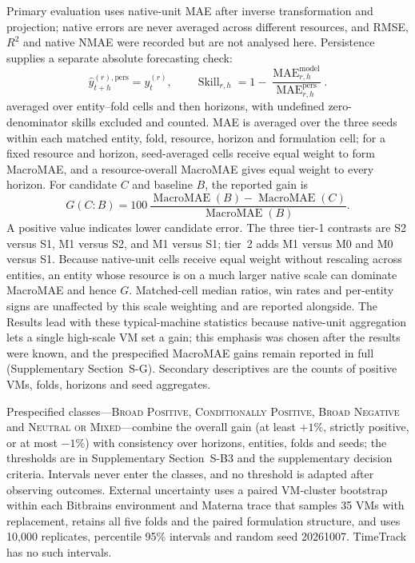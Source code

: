 \documentclass[5p,twocolumn]{elsarticle}
\begin{document}
Primary evaluation uses native-unit MAE after inverse transformation and
projection; native errors are never averaged across different resources, and
RMSE, $R^2$ and native NMAE were recorded but are not analysed here. Persistence supplies a
separate absolute forecasting check:
\begin{equation}
  \widehat{y}_{t+h}^{(r),\mathrm{pers}}=y_t^{(r)},
  \qquad
  \operatorname{Skill}_{r,h}
  =1-\frac{\operatorname{MAE}_{r,h}^{\mathrm{model}}}
           {\operatorname{MAE}_{r,h}^{\mathrm{pers}}}.
  \label{eq:persistence-skill}
\end{equation}
averaged over entity--fold cells and then horizons, with undefined
zero-denominator skills excluded and counted. MAE is averaged over the three
seeds within each matched entity, fold, resource, horizon and formulation
cell; for a fixed resource and horizon, seed-averaged cells receive equal
weight to form MacroMAE, and a resource-overall MacroMAE gives equal weight to
every horizon. For candidate $C$ and baseline $B$, the reported gain is
\begin{equation}
  G(C\!:\!B)=100\,
  \frac{\operatorname{MacroMAE}(B)-\operatorname{MacroMAE}(C)}
       {\operatorname{MacroMAE}(B)}.
  \label{eq:macro-gain}
\end{equation}
A positive value indicates lower candidate error.  The three tier-1
contrasts are S2 versus S1, M1 versus S2, and M1 versus S1; tier~2 adds M1
versus M0 and M0 versus S1. Because native-unit cells receive equal weight
without rescaling across entities, an entity whose resource is on a much
larger native scale can dominate MacroMAE and hence $G$. Matched-cell median
ratios, win rates and per-entity signs are unaffected by this scale
weighting and are reported alongside. The Results lead with these
typical-machine statistics because native-unit aggregation lets a single
high-scale VM set a gain; this emphasis was chosen after the results were
known, and the prespecified MacroMAE gains remain reported in full
(Supplementary Section~S-G). Secondary descriptives are the counts of
positive VMs, folds, horizons and seed aggregates.

Prespecified classes---\textsc{Broad Positive},
\textsc{Conditionally Positive}, \textsc{Broad Negative} and
\textsc{Neutral or Mixed}---combine the overall gain (at least $+1\%$,
strictly positive, or at most $-1\%$) with consistency over horizons,
entities, folds and seeds; the thresholds are in Supplementary
Section~S-B3 and the supplementary decision criteria. Intervals never enter
the classes, and no threshold is adapted after observing outcomes. External
uncertainty uses a paired VM-cluster bootstrap within each Bitbrains
environment and Materna trace that samples 35 VMs with replacement, retains
all five folds and the paired formulation structure, and uses 10,000
replicates, percentile 95\% intervals and random seed 20261007. TimeTrack has
no such intervals.
\end{document}
